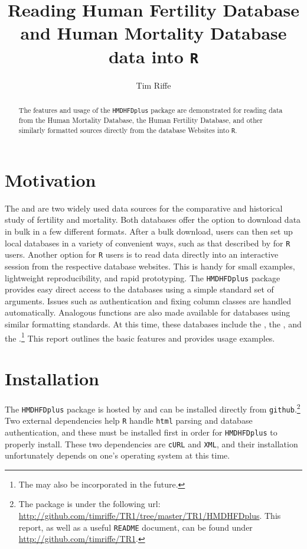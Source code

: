 \documentclass{article}
\begin{document}
\title{Reading Human Fertility Database and Human Mortality Database data into \texttt{R}}
\author{Tim Riffe}
\maketitle
\begin{abstract}
The features and usage of the \texttt{HMDHFDplus} package are demonstrated for
reading data from the Human Mortality Database, the Human Fertility Database,
and other similarly formatted sources directly from the database Websites into
\texttt{R}.
\end{abstract}

\section{Motivation}
The \citet{HFD} and \citet{HMD} are two widely used data sources
for the comparative and historical study of fertility and mortality. Both
databases offer the option to download data in bulk in a few different formats. After a bulk
download, users can then set up local databases in a variety of
convenient ways, such as that described by \citet{minton2015} for \texttt{R}
\citep{Rcitation} users. Another option for \texttt{R} users is to read data
directly into an interactive session from the respective database websites. This
is handy for small examples, lightweight reproducibility, and rapid
prototyping.
The \texttt{HMDHFDplus} package provides easy direct access to the databases using a simple standard set of arguments. Issues such as authentication and fixing column classes are handled
automatically. Analogous functions are also made
available for databases using similar formatting standards. At this time, these
databases include the \citet{JMD}, the \citet{CHMD}, and the
\citet{HFC}.\footnote{The \citet{HLD} may also be
incorporated in the future.} This report outlines the basic features and provides usage
examples.

\section{Installation}
The \texttt{HMDHFDplus} package is hosted by and can be installed
directly from \texttt{github}.\footnote{The package is under the following url:
\url{http://github.com/timriffe/TR1/tree/master/TR1/HMDHFDplus}. This report,
as well as a useful \texttt{README} document, can be found under
\url{http://github.com/timriffe/TR1}.} Two external dependencies help \texttt{R}
handle \texttt{html} parsing and database authentication, and these must be installed first in order for \texttt{HMDHFDplus} to properly install.
These two dependencies are \texttt{cURL} and \texttt{XML}, and their
installation unfortunately depends on one's operating system at this time.
\end{document}
